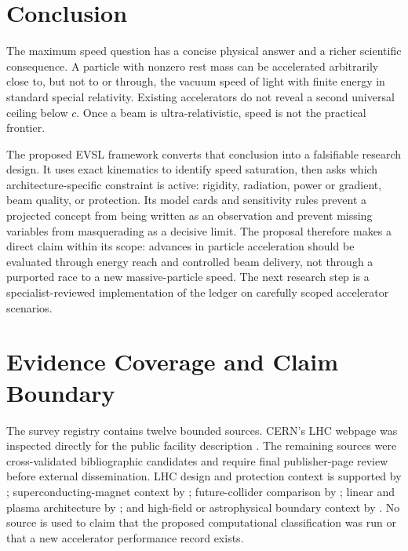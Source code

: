 \documentclass[conference]{../../../../Conference-LaTeX-template_10-17-19/IEEEtran}
\begin{document}
\section{Conclusion}
The maximum speed question has a concise physical answer and a richer scientific consequence. A particle with nonzero rest mass can be accelerated arbitrarily close to, but not to or through, the vacuum speed of light with finite energy in standard special relativity. Existing accelerators do not reveal a second universal ceiling below $c$. Once a beam is ultra-relativistic, speed is not the practical frontier.

The proposed EVSL framework converts that conclusion into a falsifiable research design. It uses exact kinematics to identify speed saturation, then asks which architecture-specific constraint is active: rigidity, radiation, power or gradient, beam quality, or protection. Its model cards and sensitivity rules prevent a projected concept from being written as an observation and prevent missing variables from masquerading as a decisive limit. The proposal therefore makes a direct claim within its scope: advances in particle acceleration should be evaluated through energy reach and controlled beam delivery, not through a purported race to a new massive-particle speed. The next research step is a specialist-reviewed implementation of the ledger on carefully scoped accelerator scenarios.

\appendices
\section{Evidence Coverage and Claim Boundary}
The survey registry contains twelve bounded sources. CERN's LHC webpage was inspected directly for the public facility description \cite{cern_lhc_page}. The remaining sources were cross-validated bibliographic candidates and require final publisher-page review before external dissemination. LHC design and protection context is supported by \cite{evans_bryant2008,bruce2014}; superconducting-magnet context by \cite{rossi_bottura2012}; future-collider comparison by \cite{abada2019,zimmermann2018}; linear and plasma architecture by \cite{behnke2013,schroeder2010,albert2020,bingham2003}; and high-field or astrophysical boundary context by \cite{gonoskov2022,hillas2005}. No source is used to claim that the proposed computational classification was run or that a new accelerator performance record exists.
\end{document}
